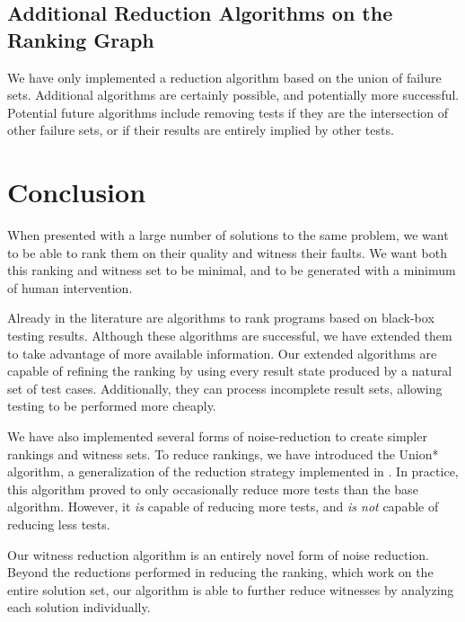 \documentclass[11pt,twoside]{article}
\theoremstyle{definition}
\let\cite=\citep
\begin{document}
\subsection{Additional Reduction Algorithms on the Ranking Graph}

We have only implemented a reduction algorithm based on the union of failure sets. Additional algorithms are certainly possible, and potentially more successful. Potential future algorithms include removing tests if they are the intersection of other failure sets, or if their results are entirely implied by other tests.

\section{Conclusion}
When presented with a large number of solutions to the same problem, we want to be able to rank them on their quality and witness their faults. We want both this ranking and witness set to be minimal, and to be generated with a minimum of human intervention.

Already in the literature are algorithms to rank programs based on black-box testing results. Although these algorithms are successful, we have extended them to take advantage of more available information. Our extended algorithms are capable of refining the ranking by using every result state produced by a natural set of test cases. Additionally, they can process incomplete result sets, allowing testing to be performed more cheaply.

We have also implemented several forms of noise-reduction to create simpler rankings and witness sets. To reduce rankings, we have introduced the Union* algorithm, a generalization of the reduction strategy implemented in \cite{Claessen}. In practice, this algorithm proved to only occasionally reduce more tests than the base algorithm. However, it \emph{is} capable of reducing more tests, and \emph{is not} capable of reducing less tests.

Our witness reduction algorithm is an entirely novel form of noise reduction. Beyond the reductions performed in reducing the ranking, which work on the entire solution set, our algorithm is able to further reduce witnesses by analyzing each solution individually.



\end{document}
